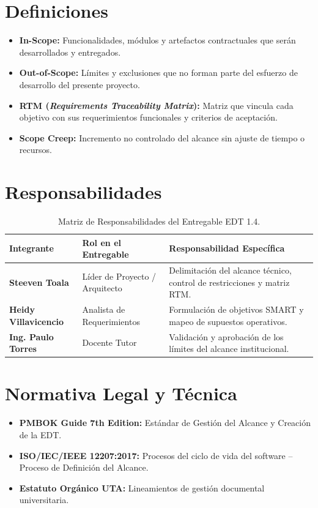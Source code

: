 \documentclass[12pt,a4paper]{article}
\begin{document}
\section{Definiciones}
\begin{itemize}[leftmargin=1.5em, itemsep=2pt]
    \item \textbf{In-Scope:} Funcionalidades, módulos y artefactos contractuales que serán desarrollados y entregados.
    \item \textbf{Out-of-Scope:} Límites y exclusiones que no forman parte del esfuerzo de desarrollo del presente proyecto.
    \item \textbf{RTM (\textit{Requirements Traceability Matrix}):} Matriz que vincula cada objetivo con sus requerimientos funcionales y criterios de aceptación.
    \item \textbf{Scope Creep:} Incremento no controlado del alcance sin ajuste de tiempo o recursos.
\end{itemize}

\section{Responsabilidades}
\begin{table}[htbp]
\centering
\small
\begin{tabularx}{\textwidth}{|>{\hsize=0.6\hsize\bfseries}X|>{\hsize=0.9\hsize}X|>{\hsize=1.5\hsize}X|}
    \hline
    \rowcolor{tableheader}
    Integrante & Rol en el Entregable & Responsabilidad Específica \\
    \hline
    Steeven Toala & Líder de Proyecto / Arquitecto & Delimitación del alcance técnico, control de restricciones y matriz RTM. \\
    \hline
    Heidy Villavicencio & Analista de Requerimientos & Formulación de objetivos SMART y mapeo de supuestos operativos. \\
    \hline
    Ing. Paulo Torres & Docente Tutor & Validación y aprobación de los límites del alcance institucional. \\
    \hline
\end{tabularx}
\caption{Matriz de Responsabilidades del Entregable EDT 1.4.}
\end{table}

\section{Normativa Legal y Técnica}
\begin{itemize}[leftmargin=1.5em, itemsep=2pt]
    \item \textbf{PMBOK Guide 7th Edition:} Estándar de Gestión del Alcance y Creación de la EDT.
    \item \textbf{ISO/IEC/IEEE 12207:2017:} Procesos del ciclo de vida del software -- Proceso de Definición del Alcance.
    \item \textbf{Estatuto Orgánico UTA:} Lineamientos de gestión documental universitaria.
\end{itemize}
\end{document}

